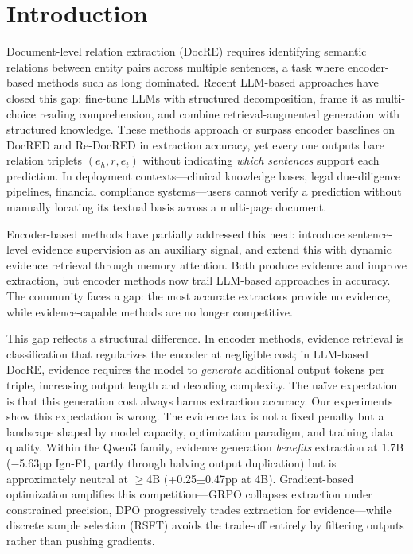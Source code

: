 \section{Introduction}

Document-level relation extraction (DocRE) requires identifying semantic relations between entity pairs across multiple sentences, a task where encoder-based methods such as \citet{zhou2021atlop} long dominated.
Recent LLM-based approaches have closed this gap: \citet{autore2024} fine-tune LLMs with structured decomposition, \citet{xu2024lmrc} frame it as multi-choice reading comprehension, and \citet{chen2025docksrag} combine retrieval-augmented generation with structured knowledge.
These methods approach or surpass encoder baselines on DocRED \citep{yao2019docred} and Re-DocRED \citep{tan2022redocred} in extraction accuracy, yet every one outputs bare relation triplets $(e_h, r, e_t)$ without indicating \emph{which sentences} support each prediction.
In deployment contexts---clinical knowledge bases, legal due-diligence pipelines, financial compliance systems---users cannot verify a prediction without manually locating its textual basis across a multi-page document.

Encoder-based methods have partially addressed this need: \citet{xiao2022sais} introduce sentence-level evidence supervision as an auxiliary signal, and \citet{ma2023dreeam} extend this with dynamic evidence retrieval through memory attention.
Both produce evidence and improve extraction, but encoder methods now trail LLM-based approaches in accuracy.
The community faces a gap: the most accurate extractors provide no evidence, while evidence-capable methods are no longer competitive.

This gap reflects a structural difference.
In encoder methods, evidence retrieval is classification that regularizes the encoder at negligible cost; in LLM-based DocRE, evidence requires the model to \emph{generate} additional output tokens per triple, increasing output length and decoding complexity.
The na\"{i}ve expectation is that this generation cost always harms extraction accuracy.
Our experiments show this expectation is wrong.
The evidence tax is not a fixed penalty but a landscape shaped by model capacity, optimization paradigm, and training data quality.
Within the Qwen3 family, evidence generation \emph{benefits} extraction at 1.7B ($-$5.63pp Ign-F1, partly through halving output duplication) but is approximately neutral at $\geq$4B (+0.25$\pm$0.47pp at 4B).
Gradient-based optimization amplifies this competition---GRPO collapses extraction under constrained precision, DPO progressively trades extraction for evidence---while discrete sample selection (RSFT) avoids the trade-off entirely by filtering outputs rather than pushing gradients.

